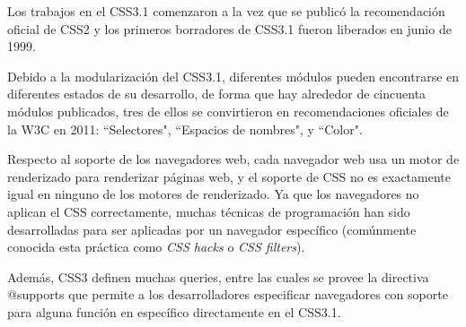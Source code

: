 Los trabajos en el CSS3.1 comenzaron a la vez que se publicó la recomendación oficial de CSS2 y los primeros borradores de CSS3.1 fueron liberados en junio de 1999.


Debido a la modularización del CSS3.1, diferentes módulos pueden encontrarse en diferentes estados de su desarrollo,​ de forma que hay alrededor de cincuenta módulos publicados,​ tres de ellos se convirtieron en recomendaciones oficiales de la W3C en 2011: ``Selectores", ``Espacios de nombres", y ``Color".


Respecto al soporte de los navegadores web, cada navegador web usa un motor de renderizado para renderizar páginas web, y el soporte de CSS no es exactamente igual en ninguno de los motores de renderizado. Ya que los navegadores no aplican el CSS correctamente, muchas técnicas de programación han sido desarrolladas para ser aplicadas por un navegador específico (comúnmente conocida esta práctica como \textit{CSS hacks} o \textit{CSS filters}).


Además, CSS3 definen muchas queries, entre las cuales se provee la directiva @supports que permite a los desarrolladores especificar navegadores con soporte para alguna función en específico directamente en el CSS3.1​. 

